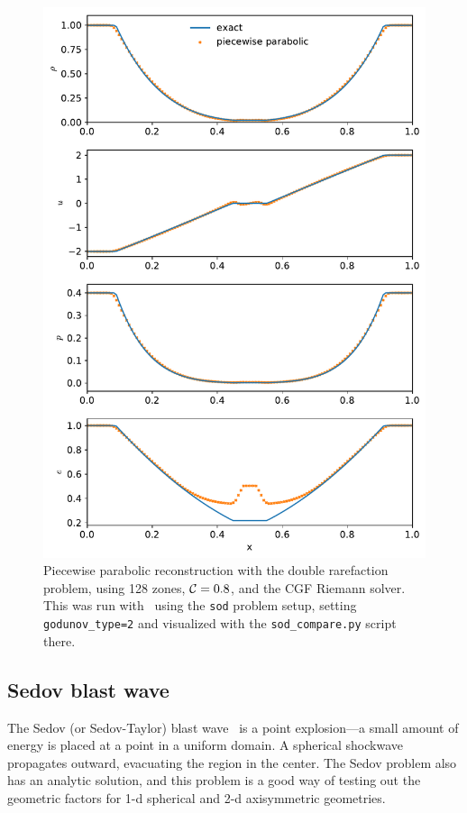 \begin{figure}[t]
\centering
\includegraphics[width=0.7\linewidth]{hydro1d_ppm_double_rare}
\caption{\label{fig:Euler:doublerare:ppm} Piecewise parabolic
  reconstruction with the double rarefaction problem, using 128 zones,
  ${\mathcal{C}} = 0.8$, and the CGF Riemann solver.  This was run with
  \hydrooned\ using the {\tt sod} problem setup, setting {\tt
    godunov\_type=2} and visualized with the {\tt sod\_compare.py}
  script there.}
\end{figure}


\subsection{Sedov blast wave}

The Sedov (or Sedov-Taylor) blast wave~\cite{sedov:1959} is a point
explosion---a small amount of energy is placed at a point in a uniform
domain.  A spherical shockwave propagates outward, evacuating the
region in the center.  The Sedov problem also has an analytic
solution, and this problem is a good way of testing out the geometric
factors for 1-d spherical and 2-d axisymmetric geometries.

